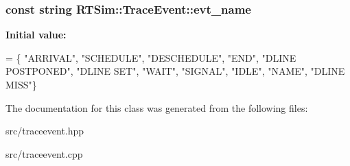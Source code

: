 \subsubsection[{\texorpdfstring{evt\+\_\+name}{evt_name}}]{\setlength{\rightskip}{0pt plus 5cm}const string R\+T\+Sim\+::\+Trace\+Event\+::evt\+\_\+name\hspace{0.3cm}{\ttfamily [static]}}\hypertarget{classRTSim_1_1TraceEvent_ae56f9692f7f310dba57850e8a307f13d}{}\label{classRTSim_1_1TraceEvent_ae56f9692f7f310dba57850e8a307f13d}
{\bfseries Initial value\+:}
\begin{DoxyCode}
= \{
    \textcolor{stringliteral}{"ARRIVAL"}, \textcolor{stringliteral}{"SCHEDULE"}, \textcolor{stringliteral}{"DESCHEDULE"}, \textcolor{stringliteral}{"END"}, \textcolor{stringliteral}{"DLINE POSTPONED"},
    \textcolor{stringliteral}{"DLINE SET"}, \textcolor{stringliteral}{"WAIT"}, \textcolor{stringliteral}{"SIGNAL"}, \textcolor{stringliteral}{"IDLE"}, \textcolor{stringliteral}{"NAME"}, \textcolor{stringliteral}{"DLINE MISS"}\}
\end{DoxyCode}


The documentation for this class was generated from the following files\+:\begin{DoxyCompactItemize}
\item 
src/traceevent.\+hpp\item 
src/traceevent.\+cpp\end{DoxyCompactItemize}
